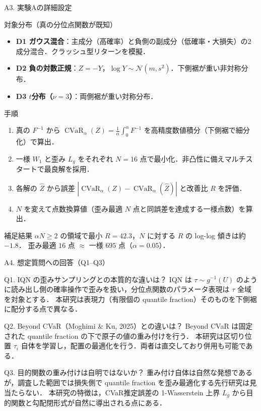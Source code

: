 \documentclass[aspectratio=169, 10pt]{beamer}
\providecommand{\Finv}{}\renewcommand{\Finv}{F^{-1}}
\DeclareMathOperator{\CVaR}{CVaR}
\newcommand{\Lg}{L_g}
\begin{document}
\begin{frame}{A3. 実験Aの詳細設定}
  \footnotesize
  \begin{block}{対象分布（真の分位点関数が既知）}
    \begin{itemize}
      \item \textbf{D1 ガウス混合}：主成分（高確率）と負側の副成分（低確率・大損失）の2成分混合．クラッシュ型リターンを模擬．
      \item \textbf{D2 負の対数正規}：$Z=-Y$，$\log Y\sim\mathcal N(m,s^2)$．下側裾が重い非対称分布．
      \item \textbf{D3 $t$分布（$\nu=3$）}：両側裾が重い対称分布．
    \end{itemize}
  \end{block}
  \begin{block}{手順}
    \begin{enumerate}
      \item 真の $\Finv$ から $\CVaR_\alpha(Z)=\tfrac1\alpha\int_0^\alpha\Finv$ を高精度数値積分（下側裾で細分化）で算出．
      \item 一様 $W_1$ と歪み $\Lg$ をそれぞれ $N=16$ 点で最小化．非凸性に備え\alert{マルチスタート}で最良解を採用．
      \item 各解の $\hat Z$ から誤差 $|\CVaR_\alpha(Z)-\CVaR_\alpha(\hat Z)|$ と改善比 $R$ を評価．
      \item $N$ を変えて点数換算値（歪み最適 $N$ 点と同誤差を達成する一様点数）を算出．
    \end{enumerate}
  \end{block}
  \begin{exampleblock}{補足結果}
    $\alpha N\ge 2$ の領域で最小 $R=42.3$，$N$ に対する $R$ の log-log 傾きは約 $-1.8$．
    歪み最適 $16$ 点 $\approx$ 一様 $695$ 点（$\alpha=0.05$）．
  \end{exampleblock}
\end{frame}

\begin{frame}{A4. 想定質問への回答（Q1--Q3）}
  \begin{alertblock}{Q1. IQN の歪みサンプリングとの本質的な違いは？}
    IQN は $\tau\sim g^{-1}(U)$ のように\alert{読み出し側の確率操作}で歪みを扱い，分位点関数のパラメータ表現は $\tau$ 全域を対象とする．
    本研究は\alert{表現力（有限個の quantile fraction）そのものを下側裾に配分}する点で異なる．
  \end{alertblock}
  \begin{alertblock}{Q2. Beyond CVaR（Moghimi \& Ku, 2025）との違いは？}
    Beyond CVaR は\alert{固定}された quantile fraction の下で原子の\alert{値の重み付け}を行う．
    本研究は\alert{区切り位置 $\tau_i$ 自体を学習}し，配置の最適化を行う．両者は直交しており併用も可能である．
  \end{alertblock}
  \begin{alertblock}{Q3. 目的関数の重み付けは自明ではないか？}
    重み付け自体は自然な発想であるが，調査した範囲では\alert{損失側で quantile fraction を歪み最適化する先行研究は見当たらない}．
    本研究の特徴は，CVaR推定誤差の 1-Wasserstein 上界 $\Lg$ から目的関数と勾配閉形式が\alert{自然に導出される}点にある．
  \end{alertblock}
\end{frame}
\end{document}
